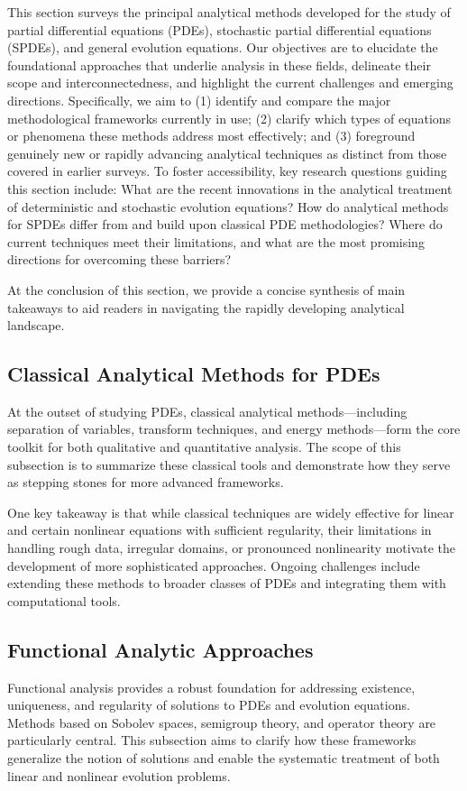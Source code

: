 \documentclass[sigconf]{acmart}
\begin{document}
This section surveys the principal analytical methods developed for the study of partial differential equations (PDEs), stochastic partial differential equations (SPDEs), and general evolution equations. Our objectives are to elucidate the foundational approaches that underlie analysis in these fields, delineate their scope and interconnectedness, and highlight the current challenges and emerging directions. Specifically, we aim to (1) identify and compare the major methodological frameworks currently in use; (2) clarify which types of equations or phenomena these methods address most effectively; and (3) foreground genuinely new or rapidly advancing analytical techniques as distinct from those covered in earlier surveys. To foster accessibility, key research questions guiding this section include: What are the recent innovations in the analytical treatment of deterministic and stochastic evolution equations? How do analytical methods for SPDEs differ from and build upon classical PDE methodologies? Where do current techniques meet their limitations, and what are the most promising directions for overcoming these barriers?

At the conclusion of this section, we provide a concise synthesis of main takeaways to aid readers in navigating the rapidly developing analytical landscape.

\subsection{Classical Analytical Methods for PDEs}
At the outset of studying PDEs, classical analytical methods—including separation of variables, transform techniques, and energy methods—form the core toolkit for both qualitative and quantitative analysis. The scope of this subsection is to summarize these classical tools and demonstrate how they serve as stepping stones for more advanced frameworks.

One key takeaway is that while classical techniques are widely effective for linear and certain nonlinear equations with sufficient regularity, their limitations in handling rough data, irregular domains, or pronounced nonlinearity motivate the development of more sophisticated approaches. Ongoing challenges include extending these methods to broader classes of PDEs and integrating them with computational tools.

\subsection{Functional Analytic Approaches}
Functional analysis provides a robust foundation for addressing existence, uniqueness, and regularity of solutions to PDEs and evolution equations. Methods based on Sobolev spaces, semigroup theory, and operator theory are particularly central. This subsection aims to clarify how these frameworks generalize the notion of solutions and enable the systematic treatment of both linear and nonlinear evolution problems.
\end{document}
